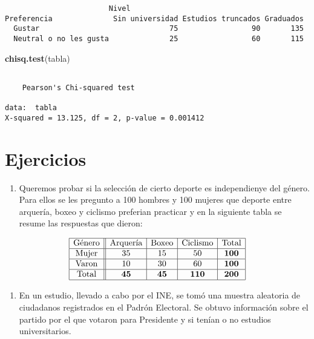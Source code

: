 \documentclass[
  a4paper,
  oneside,
  openany]{book}
\newenvironment{Shaded}{\begin{snugshade}}{\end{snugshade}}
\newcommand{\FunctionTok}[1]{\textcolor[rgb]{0.13,0.29,0.53}{\textbf{#1}}}
\newcommand{\NormalTok}[1]{#1}
\providecommand{\tightlist}{%
  \setlength{\itemsep}{0pt}\setlength{\parskip}{0pt}}
\begin{document}
\begin{verbatim}
                        Nivel
Preferencia              Sin universidad Estudios truncados Graduados
  Gustar                              75                 90       135
  Neutral o no les gusta              25                 60       115
\end{verbatim}

\begin{Shaded}
\begin{Highlighting}[]
\FunctionTok{chisq.test}\NormalTok{(tabla)}
\end{Highlighting}
\end{Shaded}

\begin{verbatim}

    Pearson's Chi-squared test

data:  tabla
X-squared = 13.125, df = 2, p-value = 0.001412
\end{verbatim}

\hypertarget{ejercicios-9}{%
\section{Ejercicios}\label{ejercicios-9}}

\begin{enumerate}
\def\labelenumi{\arabic{enumi}.}
\tightlist
\item
  Queremos probar si la selección de cierto deporte es independienye del género. Para ellos se les pregunto a 100 hombres y 100 mujeres que deporte entre arquería, boxeo y ciclismo preferian practicar y en la siguiente tabla se resume las respuestas que dieron:
\end{enumerate}

\[
\begin{array}{|c ||c |c |c|c|}
\hline 
\mbox{Género} & \mbox{Arquería}&\mbox{Boxeo} &\mbox{Ciclismo}& \mbox{Total} \\
\hline 
\mbox{Mujer} & 35 &  15 & 50&\textbf{100}\\
 \hline 
\mbox{Varon}& 10 & 30 &60&\textbf{100}\\ 
\hline 
\mbox{Total}&\textbf{45}&\textbf{45}&\textbf{110}&\textbf{200}\\
\hline 
\end{array}
\]

\begin{enumerate}
\def\labelenumi{\arabic{enumi}.}
\setcounter{enumi}{1}
\tightlist
\item
  En un estudio, llevado a cabo por el INE, se tomó una muestra aleatoria de ciudadanos registrados en el Padrón Electoral. Se obtuvo información sobre el partido por el que votaron para Presidente y si tenían o no estudios universitarios.
\end{enumerate}
\end{document}
